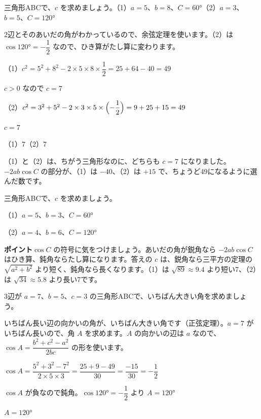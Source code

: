 \begin{reidai}[余弦定理で辺]
三角形ABCで、$c$ を求めましょう。\quad（1）$a=5$、$b=8$、$C=\ang{60}$\quad（2）$a=3$、$b=5$、$C=\ang{120}$\par
\kangaekata 2辺とそのあいだの角がわかっているので、余弦定理を使います。（2）は $\cos\ang{120}=-\dfrac{1}{2}$ なので、ひき算がたし算に変わります。\par
\shiki（1）$c^2=5^2+8^2-2\times5\times8\times\dfrac{1}{2}=25+64-40=49$\par
\hspace*{4.6\zw}$c>0$ なので $c=7$\par
\hspace*{2.6\zw}（2）$c^2=3^2+5^2-2\times3\times5\times\Bigl(-\dfrac{1}{2}\Bigr)=9+25+15=49$\par
\hspace*{4.6\zw}$c=7$\par
\kotae（1）7\quad（2）7
\end{reidai}
（1）と（2）は、ちがう三角形なのに、どちらも $c=7$ になりました。$-2ab\cos C$ の部分が、（1）は $-40$、（2）は $+15$ で、ちょうど49になるように選んだ数です。

\begin{jibun}
三角形ABCで、$c$ を求めましょう。\par
（1）$a=5$、$b=3$、$C=\ang{60}$\par
（2）$a=4$、$b=6$、$C=\ang{120}$
\end{jibun}
\textbf{ポイント}\quad $\cos C$ の符号に気をつけましょう。あいだの角が鋭角なら $-2ab\cos C$ はひき算、鈍角ならたし算になります。答えの $c$ は、鋭角なら三平方の定理の $\sqrt{a^2+b^2}$ より短く、鈍角なら長くなります。（1）は $\sqrt{89}\approx9.4$ より短い7、（2）は $\sqrt{34}\approx5.8$ より長い7です。

\begin{reidai}[3辺から角]
3辺が $a=7$、$b=5$、$c=3$ の三角形ABCで、いちばん大きい角を求めましょう。\par
\kangaekata いちばん長い辺の向かいの角が、いちばん大きい角です（正弦定理）。$a=7$ がいちばん長いので、角 $A$ を求めます。$A$ の向かいの辺は $a$ なので、$\cos A=\dfrac{b^2+c^2-a^2}{2bc}$ の形を使います。\par
\shiki $\cos A=\dfrac{5^2+3^2-7^2}{2\times5\times3}=\dfrac{25+9-49}{30}=\dfrac{-15}{30}=-\dfrac{1}{2}$\par
\hspace*{2.6\zw}$\cos A$ が負なので鈍角。$\cos\ang{120}=-\dfrac{1}{2}$ より $A=\ang{120}$\par
\kotae $A=\ang{120}$
\end{reidai}

